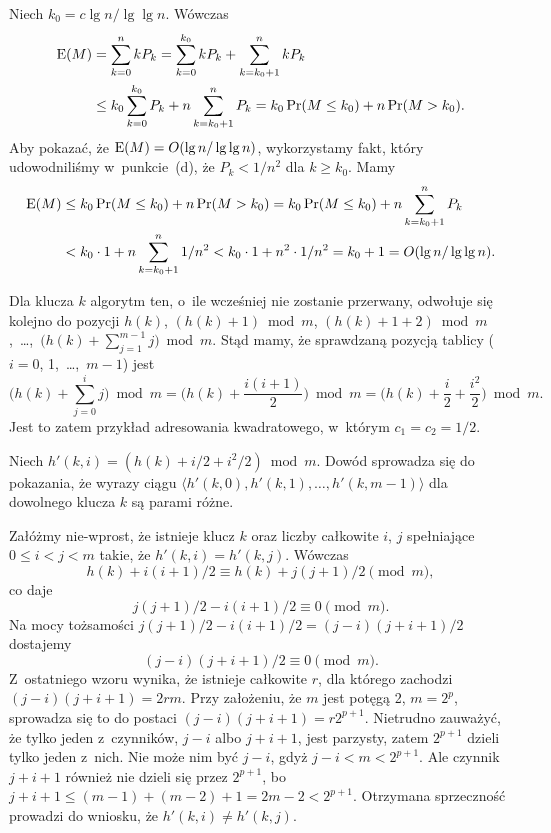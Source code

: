 \subproblem %
Niech $k_0=c\lg n/\lg\lg n$. Wówczas
\begin{align*}
	\operatorname{E}(M) &= \sum_{k=0}^nkP_k = \sum_{k=0}^{k_0}kP_k+\sum_{k=k_0+1}^nkP_k \\
	&\le k_0\sum_{k=0}^{k_0}P_k+n\sum_{k=k_0+1}^nP_k = k_0\Pr(M\le k_0)+n\Pr(M>k_0).
\end{align*}
Aby pokazać, że $\operatorname{E}(M)=O(\lg n/\lg\lg n)$, wykorzystamy fakt, który udowodniliśmy w~punkcie~(d), że $P_k<1/n^2$ dla $k\ge k_0$. Mamy
\begin{align*}
	\operatorname{E}(M) &\le k_0\Pr(M\le k_0)+n\Pr(M>k_0) = k_0\Pr(M\le k_0)+n\sum_{k=k_0+1}^nP_k \\
	&< k_0\cdot1+n\sum_{k=k_0+1}^n1/n^2 < k_0\cdot1+n^2\cdot1/n^2 = k_0+1 = O(\lg n/\lg\lg n).
\end{align*}


\subproblem %
Dla klucza $k$ algorytm ten, o~ile wcześniej nie zostanie przerwany, odwołuje się kolejno do pozycji $h(k)$, $(h(k)+1)\bmod m$, $(h(k)+1+2)\bmod m$,~\dots,~$\bigl(h(k)+\sum_{j=1}^{m-1}j\bigr)\bmod m$. Stąd mamy, że  sprawdzaną pozycją tablicy ($i=0$, 1,~\dots,~$m-1$) jest
\[
	\biggl(h(k)+\sum_{j=0}^ij\biggr)\bmod m = \biggl(h(k)+\frac{i(i+1)}{2}\biggr)\bmod m = \biggl(h(k)+\frac{i}{2}+\frac{i^2}{2}\biggr)\bmod m.
\]
Jest to zatem przykład adresowania kwadratowego, w~którym $c_1=c_2=1/2$.

\subproblem %
Niech $h'(k,i)=(h(k)+i/2+i^2\!/2)\bmod m$. Dowód sprowadza się do pokazania, że wyrazy ciągu $\langle h'(k,0),h'(k,1),\dots,h'(k,m-1)\rangle$ dla dowolnego klucza $k$ są parami różne.

Załóżmy nie-wprost, że istnieje klucz $k$ oraz liczby całkowite $i$, $j$ spełniające $0\le i<j<m$ takie, że $h'(k,i)=h'(k,j)$. Wówczas
\[
	h(k)+i(i+1)/2 \equiv h(k)+j(j+1)/2 \pmod m,
\]
co daje
\[
	j(j+1)/2-i(i+1)/2 \equiv 0 \pmod m.
\]
Na mocy tożsamości $j(j+1)/2-i(i+1)/2=(j-i)(j+i+1)/2$ dostajemy
\[
	(j-i)(j+i+1)/2 \equiv 0 \pmod m.
\]
Z~ostatniego wzoru wynika, że istnieje całkowite $r$, dla którego zachodzi $(j-i)(j+i+1)=2rm$. Przy założeniu, że $m$ jest potęgą 2, $m=2^p$, sprowadza się to do postaci $(j-i)(j+i+1)=r2^{p+1}$. Nietrudno zauważyć, że tylko jeden z~czynników, $j-i$ albo $j+i+1$, jest parzysty, zatem $2^{p+1}$ dzieli tylko jeden z~nich. Nie może nim być $j-i$, gdyż $j-i<m<2^{p+1}$. Ale czynnik $j+i+1$ również nie dzieli się przez $2^{p+1}$, bo $j+i+1\le(m-1)+(m-2)+1=2m-2<2^{p+1}$. Otrzymana sprzeczność prowadzi do wniosku, że $h'(k,i)\ne h'(k,j)$.

